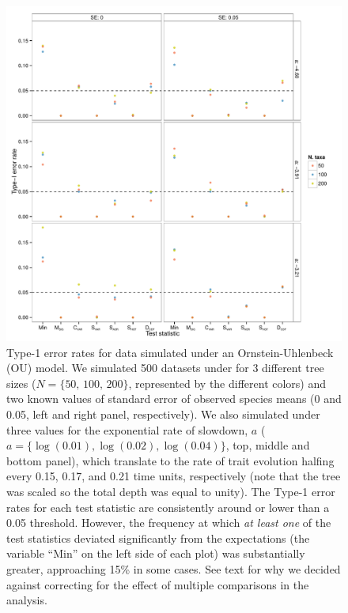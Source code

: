 \begin{figure}[p]
  \centering
  \includegraphics[width=\textwidth]{figs/eb-sim-res}
  \caption[Type-1 error rates for EB simulations]{Type-1 error rates for data simulated under an Ornstein-Uhlenbeck (OU) model. We simulated 500 datasets under for 3 different tree sizes ($N=\lbrace \text{50, 100, 200} \rbrace$, represented by the different colors) and two known values of standard error of observed species means (0 and 0.05, left and right panel, respectively). We also simulated under three values for the exponential rate of slowdown, $a$ ($a=\lbrace \log(\text{0.01}),\log(\text{0.02}),\log(\text{0.04}) \rbrace$, top, middle and bottom panel), which translate to the rate of trait evolution halfing every 0.15, 0.17, and 0.21 time units, respectively (note that the tree was scaled so the total depth was equal to unity).  The Type-1 error rates for each test statistic are consistently around or lower than a 0.05 threshold. However, the frequency at which \emph{at least one} of the test statistics deviated significantly from the expectations (the variable ``Min'' on the left side of each plot) was substantially greater, approaching 15\% in some cases. See text for why we decided against correcting for the effect of multiple comparisons in the analysis.}
  \label{fig:eb-sim}
\end{figure}

